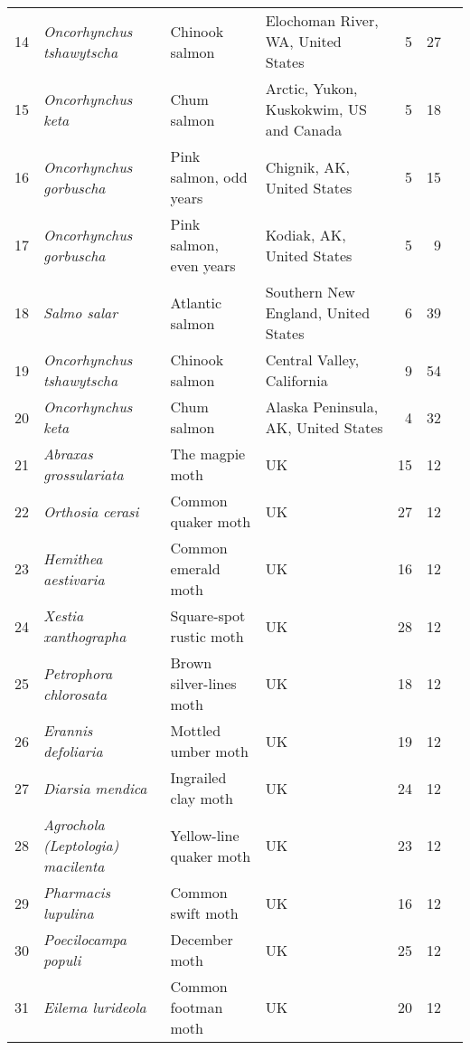 \begin{table}[ht]
\begin{center}
{\begin{tabular}{rlllrrl}
   14 & \textit{Oncorhynchus tshawytscha} & Chinook salmon & Elochoman River, WA, United States &   5 &  27 & \citep{streamnet2011} \\
   15 & \textit{Oncorhynchus keta} & Chum salmon & Arctic, Yukon, Kuskokwim, US and Canada &   5 &  18 & \citep{dorner2008} \\
   16 & \textit{Oncorhynchus gorbuscha} & Pink salmon, odd years & Chignik, AK, United States &   5 &  15 & \citep{dorner2008} \\
   17 & \textit{Oncorhynchus gorbuscha} & Pink salmon, even years & Kodiak, AK, United States &   5 &   9 & \citep{dorner2008} \\
   18 & \textit{Salmo salar} & Atlantic salmon & Southern New England, United States &   6 &  39 & \citep{kocik2006} \\
   19 & \textit{Oncorhynchus tshawytscha} & Chinook salmon & Central Valley, California &   9 &  54 & \citep{carlson2011} \\
   20 & \textit{Oncorhynchus keta} & Chum salmon & Alaska Peninsula, AK, United States &   4 &  32 & \citep{dorner2008} \\
   21 & \textit{Abraxas grossulariata} & The magpie moth & UK &  15 &  12 & \citep{conrad2004} \\
   22 & \textit{Orthosia cerasi} & Common quaker moth & UK &  27 &  12 & \citep{conrad2004} \\
   23 & \textit{Hemithea aestivaria} & Common emerald moth & UK &  16 &  12 & \citep{conrad2004} \\
   24 & \textit{Xestia xanthographa} & Square-spot rustic moth & UK &  28 &  12 & \citep{conrad2004} \\
   25 & \textit{Petrophora chlorosata} & Brown silver-lines moth & UK &  18 &  12 & \citep{conrad2004} \\
   26 & \textit{Erannis defoliaria} & Mottled umber moth & UK &  19 &  12 & \citep{conrad2004} \\
   27 & \textit{Diarsia mendica} & Ingrailed clay moth & UK &  24 &  12 & \citep{conrad2004} \\
   28 & \textit{Agrochola (Leptologia) macilenta} & Yellow-line quaker moth & UK &  23 &  12 & \citep{conrad2004} \\
   29 & \textit{Pharmacis lupulina} & Common swift moth & UK &  16 &  12 & \citep{conrad2004} \\
   30 & \textit{Poecilocampa populi} & December moth & UK &  25 &  12 & \citep{conrad2004} \\
   31 & \textit{Eilema lurideola} & Common footman moth & UK &  20 &  12 & \citep{conrad2004} \\

\end{tabular}}
\end{center}
\end{table}
